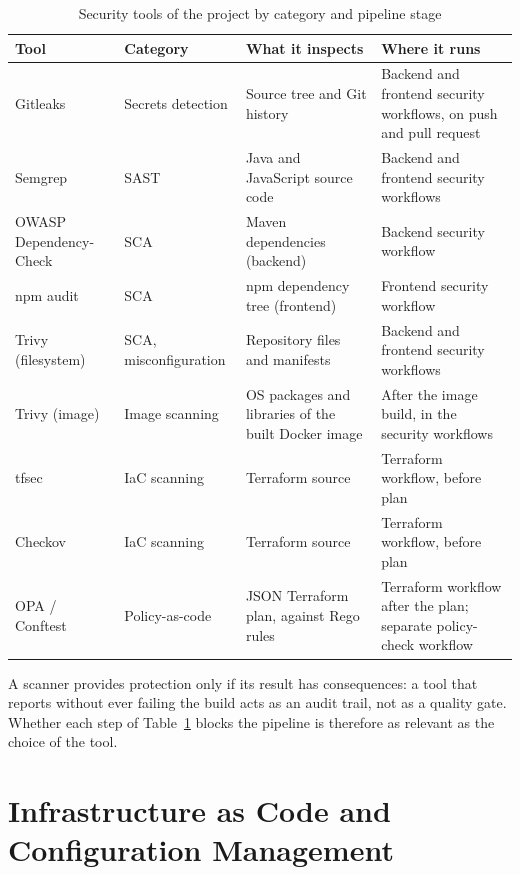 \begin{table}[htbp]
\centering
\footnotesize
\renewcommand{\arraystretch}{1.1}
\begin{tabularx}{\linewidth}{@{}l l X X@{}}
\toprule
\textbf{Tool} & \textbf{Category} & \textbf{What it inspects} & \textbf{Where it runs} \\
\midrule
Gitleaks & Secrets detection & Source tree and Git history & Backend and frontend security workflows, on push and pull request \\
Semgrep & SAST & Java and JavaScript source code & Backend and frontend security workflows \\
OWASP Dependency-Check & SCA & Maven dependencies (backend) & Backend security workflow \\
npm audit & SCA & npm dependency tree (frontend) & Frontend security workflow \\
Trivy (filesystem) & SCA, misconfiguration & Repository files and manifests & Backend and frontend security workflows \\
Trivy (image) & Image scanning & OS packages and libraries of the built Docker image & After the image build, in the security workflows \\
tfsec & IaC scanning & Terraform source & Terraform workflow, before plan \\
Checkov & IaC scanning & Terraform source & Terraform workflow, before plan \\
OPA / Conftest & Policy-as-code & JSON Terraform plan, against Rego rules & Terraform workflow after the plan; separate policy-check workflow \\
\bottomrule
\end{tabularx}
\caption{Security tools of the project by category and pipeline stage}
\label{tab:tools}
\end{table}

A scanner provides protection only if its result has consequences: a tool that reports without ever failing the build acts as an audit trail, not as a quality gate. Whether each step of Table~\ref{tab:tools} blocks the pipeline is therefore as relevant as the choice of the tool.

\section{Infrastructure as Code and Configuration Management}
\label{sec:iac}

